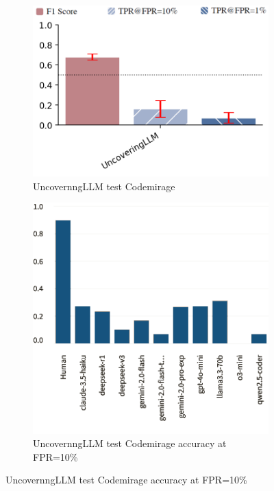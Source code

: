 \begin{figure}[H]
    \begin{subfigure}[b]{0.4\textwidth}
        \centering
        \includegraphics[width=\linewidth]{img/TEST/UncovernngLLM/ccffd05754577a21cc6a59268a66bfd331e7843ede30c92a0f3a8403.png}
        \caption{UncovernngLLM test Codemirage}
        \label{fig:3}
    \end{subfigure}
    \hfill
    \begin{subfigure}[t]{0.4\textwidth}
        \centering
        \includegraphics[width=\linewidth]{img/TEST/UncovernngLLM/visualization(311).png}
        \caption{UncovernngLLM test Codemirage accuracy at FPR=10\%}
        \label{fig:b3}
    \end{subfigure}
\end{figure}

